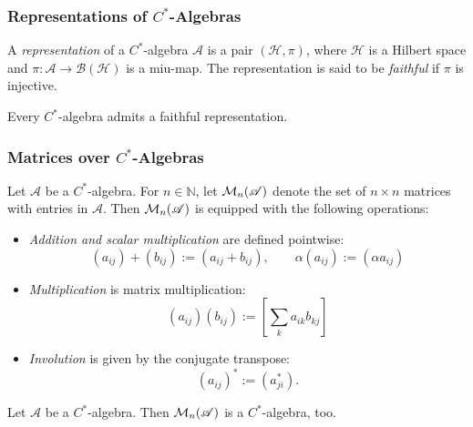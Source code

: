 \subsubsection{Representations of $C^*$-Algebras}

\begin{definition}
  A \emph{representation} of a \( C^* \)-algebra \(  \mathscr{A} \) is a pair \( (\mathcal{H}, \pi) \), where \( \mathcal{H} \) is a Hilbert space and \( \pi:  \mathscr{A} \to \mathcal{B}(\mathcal{H}) \) is a miu-map. The representation is said to be \emph{faithful} if \( \pi \) is injective. 
\end{definition}

\begin{theorem} \cite[Theorem 9.18.]{takesakiTheoryOperatorAlgebras1979}
  Every $C^*$-algebra admits a faithful representation.
\end{theorem}

\subsubsection{Matrices over $C^*$-Algebras}

\begin{definition}
  Let \( \mathscr{A} \) be a \(C^*\)-algebra. For \( n \in \mathbb{N} \), let \( \mathcal{M}_{n}(\mathscr{A} )\) denote the set of \( n \times n \) matrices with entries in \( \mathscr{A} \). Then \( \mathcal{M}_{n}(\mathscr{A} )\) is equipped with the following operations:

\begin{itemize}
    \item \emph{Addition and scalar multiplication} are defined pointwise:
    \[
    (a_{ij}) + (b_{ij}) := (a_{ij} + b_{ij}), \qquad
    \alpha (a_{ij}) := (\alpha a_{ij})
    \]
    
    \item \emph{Multiplication} is matrix multiplication:
    \[
    (a_{ij}) (b_{ij}) := \left[ \sum_k a_{ik} b_{kj} \right]
    \]
    
    \item \emph{Involution} is given by the conjugate transpose:
    \[
    (a_{ij})^* := (a_{ji}^*).
    \]
\end{itemize}
\end{definition}

\begin{proposition} \cite[p.16-17]{paulsenCompletelyBoundedMaps2003}
  Let $ \mathscr{A}$ be a $C^*$-algebra. Then $\mathcal{M}_{n}(\mathscr{A})$ is a $C^*$-algebra, too.
\end{proposition}

